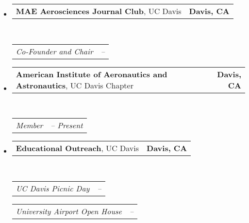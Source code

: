 \documentclass[10pt,letterpaper,MMMyyyy,nonstop]{simpleresumecv}
\makeatletter
\newcommand{\headerrow}[2]
{\begin{tabular*}{\linewidth}{l@{\extracolsep{\fill}}r}
    #1 &
    #2 \\
\end{tabular*}}
\makeatother
\begin{document}
\begin{itemize}
    \parskip=0.1em

    \item
        \headerrow
        {\textbf{MAE Aerosciences Journal Club}, UC Davis}
        {\textbf{Davis, CA}}
        \\
        \headerrow
        {\emph{Co-Founder and Chair}}
        {\emph{\DatestampY{2016} -- \DatestampY{2018}}}

    \item
        \headerrow
        {\textbf{American Institute of Aeronautics and Astronautics}, UC Davis Chapter}
        {\textbf{Davis, CA}}
        \\
        \headerrow
        {\emph{Member}}
        {\emph{\DatestampY{2011} -- Present}}


    \item
        \headerrow
        {\textbf{Educational Outreach}, UC Davis}
        {\textbf{Davis, CA}}
        \\
        \headerrow
        {\emph{UC Davis Picnic Day}}
        {\emph{\DatestampY{2014} -- \DatestampY{2019}}}

        \headerrow
        {\emph{University Airport Open House}}
        {\emph{\DatestampY{2014} -- \DatestampY{2017}}}


\end{itemize}
\end{document}
